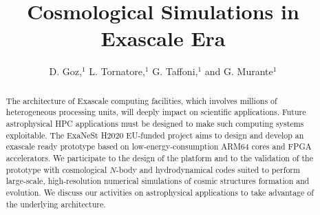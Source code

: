 \documentclass[11pt,twoside]{article}
\begin{document}
\title{Cosmological Simulations in Exascale Era}

\author{D. Goz,$^1$ L. Tornatore,$^1$ G. Taffoni,$^1$ and G. Murante$^1$}



\begin{abstract}
The architecture of Exascale computing facilities, which involves millions of heterogeneous processing units, 
will deeply impact on scientific applications. Future astrophysical HPC applications must be designed to make 
such computing systems exploitable.
The ExaNeSt H2020 EU-funded project aims to design and develop an exascale ready prototype based on low-energy-consumption 
ARM64 cores and FPGA accelerators. We participate to the design of the platform and to the validation 
of the prototype with cosmological $N$-body and hydrodynamical codes suited to perform large-scale, 
high-resolution numerical simulations of cosmic structures formation and evolution.  
We discuss our activities on astrophysical applications to take advantage of the underlying architecture.

\end{abstract}
\end{document}
